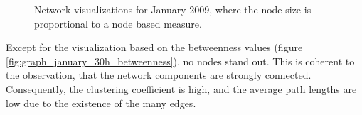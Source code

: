 \begin{figure}[htpb]
{				}
	\qquad 			
	\qquad 
		
	\caption[Network visualizations where the node size is proportional to node based measures]{Network visualizations for January 2009, where the node size is proportional to a node based measure.}
	\label{fig:graph_january_30h_node_based_measures} 
	 
\end{figure}

Except for the visualization based on the betweenness values (figure \ref{fig:graph_january_30h_betweenness}), no nodes stand out. This is coherent to the observation, that the network components are strongly connected. Consequently, the clustering coefficient is high, and the average path lengths are low due to the existence of the many edges.  

